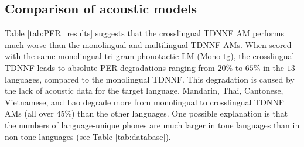 \documentclass{article}
\begin{document}
 \subsection{Comparison of acoustic models}
 Table \ref{tab:PER_results} suggests that the crosslingual TDNNF  AM performs much worse than the monolingual and multilingual TDNNF AMs. When scored with the same monolingual tri-gram phonotactic LM (Mono-tg), the crosslingual TDNNF leads to absolute PER degradations ranging from $20\%$ to $65\%$ in the $13$ languages, compared to the monolingual TDNNF. This degradation is caused by the lack of acoustic data for the target language.
 Mandarin, Thai, Cantonese, Vietnamese, and Lao degrade more from monolingual to crosslingual TDNNF AMs (all over $45\%$) than the other languages.
 One possible explanation is that the numbers of language-unique phones  are much larger in tone languages than in non-tone languages (see Table \ref{tab:database}).
 
\end{document}
